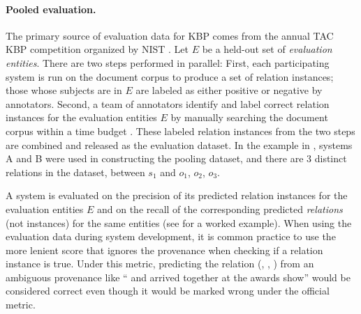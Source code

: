 \paragraph{Pooled evaluation.}

The primary source of evaluation data for KBP comes from the annual TAC KBP competition organized by NIST \citep{ji2011kbp}.
Let $E$ be a held-out set of \emph{evaluation entities}.
There are two steps performed in parallel:
First, each participating system is run on the document corpus to produce a set of relation instances;
those whose subjects are in $E$ are labeled as either positive or negative by annotators.
Second, a team of annotators identify and label correct relation instances for the evaluation entities $E$ by manually searching the document corpus within a time budget \citep{ellis2012kbp}.
These labeled relation instances from the two steps are combined and released as the evaluation dataset.
In the example in , systems A and B were used in constructing the pooling dataset, and there are 3 distinct relations in the dataset, between $s_1$ and $o_1$, $o_2$, $o_3$.

A system is evaluated on the precision of its predicted relation instances for the evaluation entities $E$ and on the recall of the corresponding predicted \textit{relations} (not instances) for the same entities (see  for a worked example).
When using the evaluation data during system development, it is common practice to use the more lenient \anydoc{} score that ignores the provenance when checking if a relation instance is true.
Under this metric, predicting the relation (, , ) from an ambiguous provenance like `` and  arrived together at the awards show'' would be considered correct even though it would be marked wrong under the official metric.



